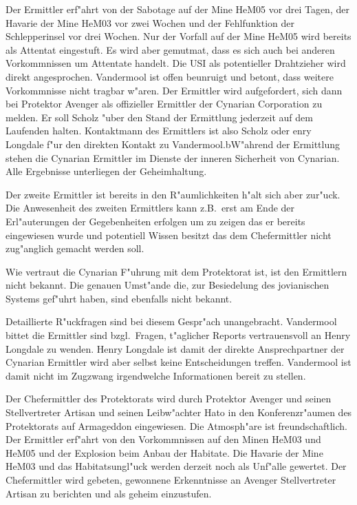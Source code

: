 Der Ermittler erf"ahrt von der Sabotage auf der Mine HeM05 vor drei Tagen, der Havarie der Mine HeM03 vor zwei Wochen und der Fehlfunktion der Schlepperinsel vor drei Wochen. Nur der Vorfall auf der Mine HeM05 wird bereits als Attentat eingestuft. Es wird aber gemutma\3t, dass es sich auch bei anderen Vorkommnissen um Attentate handelt. Die USI als potentieller Drahtzieher wird direkt angesprochen. Vandermool ist offen beunruigt und betont, dass weitere Vorkommnisse nicht tragbar w"aren. Der Ermittler wird aufgefordert, sich dann bei Protektor Avenger als offizieller Ermittler der Cynarian Corporation zu melden. Er soll Scholz "uber den Stand der Ermittlung jederzeit auf dem Laufenden halten. Kontaktmann des Ermittlers ist also Scholz oder enry Longdale f"ur den direkten Kontakt zu Vandermool.bW"ahrend der Ermittlung stehen die Cynarian Ermittler im Dienste der inneren Sicherheit von Cynarian. Alle Ergebnisse unterliegen der Geheimhaltung.

Der zweite Ermittler ist bereits in den R"aumlichkeiten h"alt sich aber zur"uck. Die Anwesenheit des zweiten Ermittlers kann z.B.~erst am Ende der Erl"auterungen der Gegebenheiten erfolgen um zu zeigen das er bereits eingewiesen wurde und potentiell Wissen besitzt das dem Chefermittler nicht zug"anglich gemacht werden soll.


\begin{remarks}	
	Wie vertraut die Cynarian F"uhrung mit dem Protektorat ist, ist den Ermittlern nicht bekannt. Die genauen Umst"ande die, zur Besiedelung des jovianischen Systems gef"uhrt haben, sind ebenfalls nicht bekannt.
	
	Detaillierte R"uckfragen sind bei diesem Gespr"ach unangebracht. Vandermool bittet die Ermittler sind bzgl.~Fragen, t"aglicher Reports vertrauensvoll an Henry Longdale zu wenden. Henry Longdale ist damit der direkte Ansprechpartner der Cynarian Ermittler wird aber selbst keine Entscheidungen treffen. Vandermool ist damit nicht im Zugzwang irgendwelche Informationen bereit zu stellen.
\end{remarks}


Der Chefermittler des Protektorats wird durch Protektor Avenger und seinen Stellvertreter Artisan und seinen Leibw"achter Hato in den Konferenzr"aumen des Protektorats auf Armageddon eingewiesen. Die Atmosph"are ist freundschaftlich. Der Ermittler erf"ahrt von den Vorkommnissen auf den Minen HeM03 und HeM05 und der Explosion beim Anbau der Habitate. Die Havarie der Mine HeM03 und das Habitatsungl"uck werden derzeit noch als Unf"alle gewertet. Der Chefermittler wird gebeten, gewonnene Erkenntnisse an Avenger Stellvertreter Artisan zu berichten und als geheim einzustufen.

